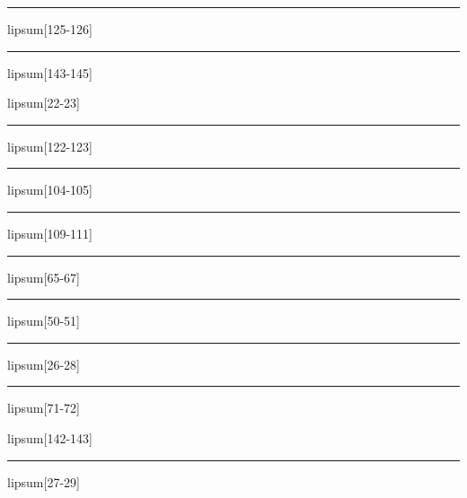 \documentclass[11pt,a4paper]{article}
\begin{document}
\begin{simplewrap}
  \textcolor{pink!31}{\rule{3.1cm}{8.8cm}}
\end{simplewrap}
lipsum[125-126]

\begin{simplewrap}
  \textcolor{teal!31}{\rule{3.8cm}{6.8cm}}
\end{simplewrap}
lipsum[143-145]

lipsum[22-23]

\begin{simplewrap}
  \textcolor{magenta!56}{\rule{4.2cm}{6.4cm}}
\end{simplewrap}
lipsum[122-123]

\begin{simplewrap}
  \textcolor{red!38}{\rule{5.4cm}{2.7cm}}
\end{simplewrap}
lipsum[104-105]

\begin{simplewrap}
  \textcolor{violet!52}{\rule{4.7cm}{5.8cm}}
\end{simplewrap}
lipsum[109-111]

\begin{simplewrap}
  \textcolor{magenta!31}{\rule{4.1cm}{5.6cm}}
\end{simplewrap}
lipsum[65-67]

\begin{simplewrap}
  \textcolor{yellow!30}{\rule{3.4cm}{6.3cm}}
\end{simplewrap}
lipsum[50-51]

\begin{simplewrap}
  \textcolor{red!27}{\rule{5.2cm}{9.8cm}}
\end{simplewrap}
lipsum[26-28]

\begin{simplewrap}
  \textcolor{violet!24}{\rule{4.1cm}{4.4cm}}
\end{simplewrap}
lipsum[71-72]

lipsum[142-143]

\begin{simplewrap}
  \textcolor{violet!54}{\rule{5.8cm}{7.1cm}}
\end{simplewrap}
lipsum[27-29]
\end{document}
